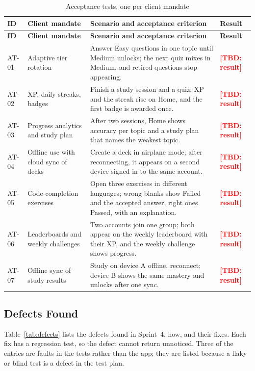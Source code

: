 \documentclass[12pt,letterpaper]{article}
\newcommand{\tbd}[1]{\textcolor{red}{\textbf{[TBD: #1]}}}
\begin{document}
\begin{xltabular}{\textwidth}{@{}L{1.0cm} L{3.0cm} Y L{2.0cm}@{}}
\caption{Acceptance tests, one per client mandate}\label{tab:accept}\\
\toprule
\textbf{ID} & \textbf{Client mandate} & \textbf{Scenario and acceptance criterion} & \textbf{Result} \\
\midrule
\endfirsthead
\toprule
\textbf{ID} & \textbf{Client mandate} & \textbf{Scenario and acceptance criterion} & \textbf{Result} \\
\midrule
\endhead
\bottomrule
\endfoot
AT-01 & Adaptive tier rotation & Answer Easy questions in one topic until Medium unlocks; the next quiz mixes in Medium, and retired questions stop appearing. & \tbd{result} \\
AT-02 & XP, daily streaks, badges & Finish a study session and a quiz; XP and the streak rise on Home, and the first badge is awarded once. & \tbd{result} \\
AT-03 & Progress analytics and study plan & After two sessions, Home shows accuracy per topic and a study plan that names the weakest topic. & \tbd{result} \\
AT-04 & Offline use with cloud sync of decks & Create a deck in airplane mode; after reconnecting, it appears on a second device signed in to the same account. & \tbd{result} \\
AT-05 & Code-completion exercises & Open three exercises in different languages; wrong blanks show Failed and the accepted answer, right ones Passed, with an explanation. & \tbd{result} \\
AT-06 & Leaderboards and weekly challenges & Two accounts join one group; both appear on the weekly leaderboard with their XP, and the weekly challenge shows progress. & \tbd{result} \\
AT-07 & Offline sync of study results & Study on device A offline, reconnect; device B shows the same mastery and unlocks after one sync. & \tbd{result} \\
\end{xltabular}

\subsection{Defects Found}\label{sec:defects}
Table~\ref{tab:defects} lists the defects found in Sprint~4, how, and their fixes.
Each fix has a regression test, so the defect cannot return unnoticed. Three of the
entries are faults in the tests rather than the app; they are listed because a flaky
or blind test is a defect in the test plan.
\end{document}
